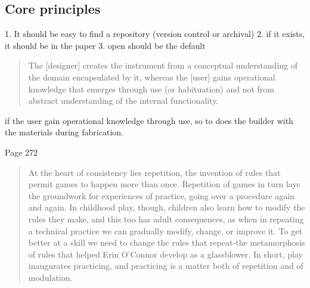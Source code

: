 \subsection{Core principles}

1. It should be easy to find a repository (version control or archival)
2. if it exists, it should be in the paper
3. open should be the default


\cite{magnusson_epistemic_2009}

\begin{quote}
    The [designer] creates the instrument from a conceptual understanding of the domain encapsulated by it, whereas the [user] gains operational knowledge that emerges through use (or habituation) and not from abstract understanding of the internal functionality.
\end{quote}

if the user gain operational knowledge through use, so to does the builder with the materials during fabrication.






\cite{sennett_craftsman_2008} Page 272
\begin{quote}
    At the heart of consistency lies repetition, the invention of rules that permit games to happen more than once.
    Repetition of games in turn lays the groundwork for experiences of practice, going over a procedure again and again. In childhood play, though, children also learn how to modify the rules they make, and this too has adult consequences, as when in repeating a technical practice we can gradually modify, change, or improve it. To get better at a skill we need to change the rules that repeat-the metamorphosis of rules that helped Erin O'Connor develop as a glassblower. In short, play inaugurates practicing, and practicing is a matter both of repetition and of modulation.
\end{quote}



